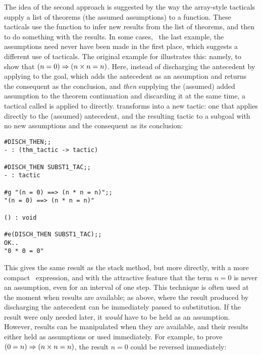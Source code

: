 {The idea of the second approach is suggested by the way the array-style
tacticals supply a list of theorems (the assumed assumptions) 
to a function.  These tacticals use the function to
infer new 
results from the list of theorems, and then to do something with the
results. In some cases, 
\eg\ the last example, the assumptions need never have been made in the
first place, which suggests a different use of tacticals.
The original example for 
illustrates this: namely, to show that $(n = 0) \Rightarrow (n\times n = n)$.  Here,
instead of discharging the antecedent by applying
 to the goal, which adds the antecedent as an assumption
and returns the consequent as the conclusion,
and {\it then\/} supplying the (assumed) added assumption to the
theorem continuation  and
discarding it at the same time,
a tactical called  is applied to  directly.
 transforms  into
a new tactic: one that applies  directly to the (assumed)
antecedent, and the resulting tactic to a subgoal with no new
assumptions and the consequent as its conclusion:
\vfill
\newpage

\setcounter{sessioncount}{1}
\begin{session}\begin{verbatim}
#DISCH_THEN;;
- : (thm_tactic -> tactic)

#DISCH_THEN SUBST1_TAC;;
- : tactic

#g "(n = 0) ==> (n * n = n)";;
"(n = 0) ==> (n * n = n)"

() : void

#e(DISCH_THEN SUBST1_TAC);;
OK..
"0 * 0 = 0"
\end{verbatim}\end{session}

\noindent This gives the same result as the stack method, but more
directly, with a more compact \ML\ expression,
and with the attractive feature that the term
$n=0$ is never an assumption, even for an interval of one step.
This technique is often used at the moment when results are available;
as above, where the result produced by discharging the antecedent can be
immediately passed to substitution. If the result were only needed
later, it {\it would\/} have to be held as an assumption. However, results
can be manipulated when they are available, and their results
either held as assumptions or used immediately.
For example, to prove $(0=n) \Rightarrow (n \times n = n)$, 
the result $n=0$ could be reversed
immediately:

}

